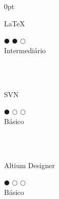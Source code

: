\documentclass[a4paper]{article}
\begin{document}
\begin{adjustwidth}{\parindent}{0pt}
\begin{minipage}[t]{0.25\textwidth}
\begin{minipage}{0.65\textwidth}
  \small{\LaTeX}
\end{minipage}
\begin{minipage}{0.3\textwidth}
  \centering $\mdlgblkcircle$ $\mdlgblkcircle$ $\mdlgwhtcircle$ \\  \footnotesize{\mbox{Intermediário}}
\end{minipage} \\ \hspace{0pt} \\

 \begin{minipage}{0.65\textwidth}
   \small{SVN}
 \end{minipage}
 \begin{minipage}{0.3\textwidth}
   \centering $\mdlgblkcircle$ $\mdlgwhtcircle$ $\mdlgwhtcircle$ \\  \footnotesize{Básico}
 \end{minipage} \\ \hspace{0pt} \\
 
  \begin{minipage}{0.65\textwidth}
   \small{Altium Designer}
 \end{minipage}
 \begin{minipage}{0.3\textwidth}
   \centering $\mdlgblkcircle$ $\mdlgwhtcircle$ $\mdlgwhtcircle$ \\  \footnotesize{Básico}
 \end{minipage} \\ \hspace{0pt} \\

\end{minipage}
\end{adjustwidth}
\end{document}
